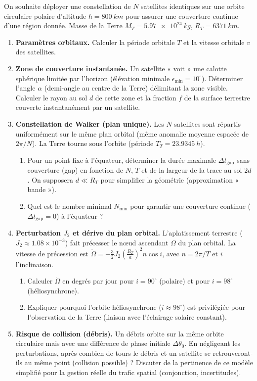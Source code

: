 \documentclass[11pt]{article}
\begin{document}
\begin{exercice}
On souhaite déployer une constellation de $N$ satellites identiques sur une orbite circulaire polaire d'altitude $h = \SI{800}{km}$ pour assurer une couverture continue d'une région donnée. Masse de la Terre $M_T = \SI{5.97e24}{kg}$, $R_T = \SI{6371}{km}$.
\begin{enumerate}
    \item \textbf{Paramètres orbitaux.} Calculer la période orbitale $T$ et la vitesse orbitale $v$ des satellites.
    \item \textbf{Zone de couverture instantanée.} Un satellite « voit » une calotte sphérique limitée par l'horizon (élévation minimale $\epsilon_{\min} = 10^\circ$). Déterminer l'angle $\alpha$ (demi-angle au centre de la Terre) délimitant la zone visible. Calculer le rayon au sol $d$ de cette zone et la fraction $f$ de la surface terrestre couverte instantanément par un satellite.
    \item \textbf{Constellation de Walker (plan unique).} Les $N$ satellites sont répartis uniformément sur le même plan orbital (même anomalie moyenne espacée de $2\pi/N$). La Terre tourne sous l'orbite (période $T_T = \SI{23.9345}{h}$).
    \begin{enumerate}
        \item Pour un point fixe à l'équateur, déterminer la durée maximale $\Delta t_{\text{gap}}$ sans couverture (gap) en fonction de $N$, $T$ et de la largeur de la trace au sol $2d$. On supposera $d \ll R_T$ pour simplifier la géométrie (approximation « bande »).
        \item Quel est le nombre minimal $N_{\min}$ pour garantir une couverture continue ($\Delta t_{\text{gap}} = 0$) à l'équateur ?
    \end{enumerate}
    \item \textbf{Perturbation $J_2$ et dérive du plan orbital.} L'aplatissement terrestre ($J_2 \approx 1.08 \times 10^{-3}$) fait précesser le nœud ascendant $\Omega$ du plan orbital. La vitesse de précession est $\dot{\Omega} = -\frac{3}{2} J_2 \left( \frac{R_T}{a} \right)^2 n \cos i$, avec $n = 2\pi/T$ et $i$ l'inclinaison.
    \begin{enumerate}
        \item Calculer $\dot{\Omega}$ en degrés par jour pour $i = 90^\circ$ (polaire) et pour $i = 98^\circ$ (héliosynchrone).
        \item Expliquer pourquoi l'orbite héliosynchrone ($i \approx 98^\circ$) est privilégiée pour l'observation de la Terre (liaison avec l'éclairage solaire constant).
    \end{enumerate}
    \item \textbf{Risque de collision (débris).} Un débris orbite sur la même orbite circulaire mais avec une différence de phase initiale $\Delta \theta_0$. En négligeant les perturbations, après combien de tours le débris et un satellite se retrouveront-ils au même point (collision possible) ? Discuter de la pertinence de ce modèle simplifié pour la gestion réelle du trafic spatial (conjonction, incertitudes).
\end{enumerate}
\end{exercice}
\end{document}
